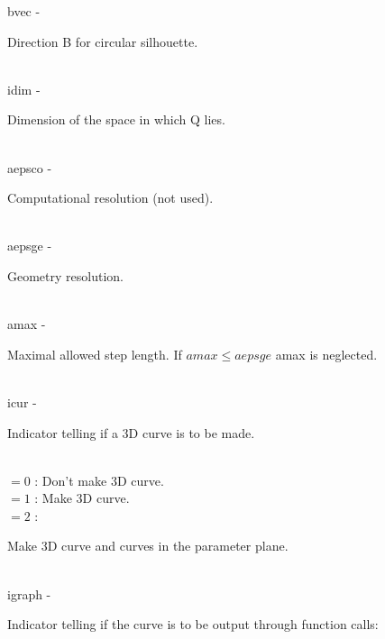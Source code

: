         \>\>    {\fov bvec}\> - \>  \begin{minipg2}
                     Direction B for circular silhouette.
                               \end{minipg2}\\
        \>\>    {\fov idim}\> - \>  \begin{minipg2}
                     Dimension of the space in which Q lies.
                               \end{minipg2}\\
        \>\>    {\fov aepsco}\> - \>  \begin{minipg2}
                     Computational resolution (not used).
                               \end{minipg2}\\
        \>\>    {\fov aepsge}\> - \>  \begin{minipg2}
                     Geometry resolution.
                               \end{minipg2}\\
        \>\>    {\fov amax}\> - \>  \begin{minipg2}
                     Maximal allowed step length. If $amax\leq aepsge$
                       {\fov amax} is neglected.
                               \end{minipg2}\\
        \>\>    {\fov icur}\> - \>  \begin{minipg2}
                    Indicator telling if a 3D curve is to be made.
                               \end{minipg2}\\
                    \>\>\>\>\> $= 0$ \> : Don't make 3D curve.\\
                    \>\>\>\>\> $= 1$ \> : Make 3D curve.\\
                    \>\>\>\>\> $= 2$ \> : \begin{minipg5}
                                            Make 3D curve and curves in
                                            the parameter plane.
                                          \end{minipg5}\\[0.8ex]
        \>\>    {\fov igraph}\> - \>  \begin{minipg2}
                     Indicator telling if the curve is to be output
                       through function calls:\\
                               \end{minipg2}\\
